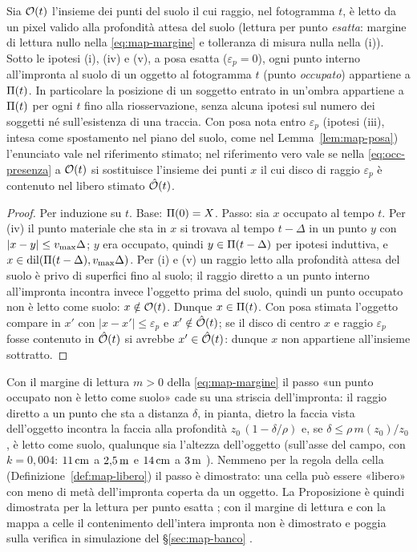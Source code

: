\begin{proposizione}[Contenimento]\label{prop:occ-contenimento}
Sia $\mathcal{O}(t)$ l'insieme dei punti del suolo il cui raggio, nel fotogramma $t$, è letto da un pixel valido alla profondità attesa del suolo (lettura per punto \emph{esatta}: margine di lettura nullo nella \eqref{eq:map-margine} e tolleranza di misura nulla nella (i)). Sotto le ipotesi (i), (iv) e (v), a posa esatta ($\varepsilon_p=0$), ogni punto interno all'impronta al suolo di un oggetto al fotogramma $t$ (punto \emph{occupato}) appartiene a $\Pi(t)$. In particolare la posizione di un soggetto entrato in un'ombra appartiene a $\Pi(t)$ per ogni $t$ fino alla riosservazione, senza alcuna ipotesi sul numero dei soggetti né sull'esistenza di una traccia. Con posa nota entro $\varepsilon_p$ (ipotesi (iii), intesa come spostamento nel piano del suolo, come nel Lemma~\ref{lem:map-posa}) l'enunciato vale nel riferimento stimato; nel riferimento vero vale se nella \eqref{eq:occ-presenza} a $\mathcal{O}(t)$ si sostituisce l'insieme dei punti $x$ il cui disco di raggio $\varepsilon_p$ è contenuto nel libero stimato $\hat{\mathcal{O}}(t)$. 
\end{proposizione}
\begin{proof}
Per induzione su $t$. Base: $\Pi(0)=X$. Passo: sia $x$ occupato al tempo $t$. Per (iv) il punto materiale che sta in $x$ si trovava al tempo $t-\Delta$ in un punto $y$ con $|x-y|\le v_{\max}\Delta$; $y$ era occupato, quindi $y\in\Pi(t-\Delta)$ per ipotesi induttiva, e $x\in\operatorname{dil}(\Pi(t-\Delta),v_{\max}\Delta)$. Per (i) e (v) un raggio letto alla profondità attesa del suolo è privo di superfici fino al suolo; il raggio diretto a un punto interno all'impronta incontra invece l'oggetto prima del suolo, quindi un punto occupato non è letto come suolo: $x\notin\mathcal{O}(t)$. Dunque $x\in\Pi(t)$. Con posa stimata l'oggetto compare in $x'$ con $|x-x'|\le\varepsilon_p$ e $x'\notin\hat{\mathcal{O}}(t)$; se il disco di centro $x$ e raggio $\varepsilon_p$ fosse contenuto in $\hat{\mathcal{O}}(t)$ si avrebbe $x'\in\hat{\mathcal{O}}(t)$: dunque $x$ non appartiene all'insieme sottratto.
\end{proof}

Con il margine di lettura $m>0$ della \eqref{eq:map-margine} il passo «un punto occupato non è letto come suolo» cade su una striscia dell'impronta: il raggio diretto a un punto che sta a distanza $\delta$, in pianta, dietro la faccia vista dell'oggetto incontra la faccia alla profondità $z_0\,(1-\delta/\rho)$ e, se $\delta\le\rho\,m(z_0)/z_0$, è letto come suolo, qualunque sia l'altezza dell'oggetto (sull'asse del campo, con $k=0{,}004$: $11\,\mathrm{cm}$ a $2{,}5\,\mathrm{m}$ e $14\,\mathrm{cm}$ a $3\,\mathrm{m}$ ). Nemmeno per la regola della cella (Definizione~\ref{def:map-libero}) il passo è dimostrato: una cella può essere «libero» con meno di metà dell'impronta coperta da un oggetto. La Proposizione è quindi dimostrata per la lettura per punto esatta ; con il margine di lettura e con la mappa a celle il contenimento dell'intera impronta non è dimostrato e poggia sulla verifica in simulazione del \S\ref{sec:map-banco} .

